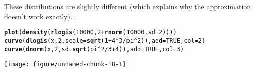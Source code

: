 \documentclass{article}\usepackage[]{graphicx}\usepackage[]{color}
\makeatletter
\def\maxwidth{ %
  \ifdim\Gin@nat@width>\linewidth
    \linewidth
  \else
    \Gin@nat@width
  \fi
}
\newcommand{\hlnum}[1]{\textcolor[rgb]{0.686,0.059,0.569}{#1}}%
\newcommand{\hlopt}[1]{\textcolor[rgb]{0,0,0}{#1}}%
\newcommand{\hlstd}[1]{\textcolor[rgb]{0.345,0.345,0.345}{#1}}%
\newcommand{\hlkwc}[1]{\textcolor[rgb]{0.333,0.667,0.333}{#1}}%
\newcommand{\hlkwd}[1]{\textcolor[rgb]{0.737,0.353,0.396}{\textbf{#1}}}%
\newenvironment{kframe}{%
 \def\at@end@of@kframe{}%
 \ifinner\ifhmode%
  \def\at@end@of@kframe{\end{minipage}}%
  \begin{minipage}{\columnwidth}%
 \fi\fi%
 \def\FrameCommand##1{\hskip\@totalleftmargin \hskip-\fboxsep
 \colorbox{shadecolor}{##1}\hskip-\fboxsep
     \hskip-\linewidth \hskip-\@totalleftmargin \hskip\columnwidth}%
 \MakeFramed {\advance\hsize-\width
   \@totalleftmargin\z@ \linewidth\hsize
   \@setminipage}}%
 {\par\unskip\endMakeFramed%
 \at@end@of@kframe}
\newenvironment{knitrout}{}{} %
\makeatother
\begin{document}
These distributions are slightly different (which explains why the approximation doesn't work exactly)...

\begin{knitrout}
\color{fgcolor}\begin{kframe}
\begin{alltt}
\hlkwd{plot}\hlstd{(}\hlkwd{density}\hlstd{(}\hlkwd{rlogis}\hlstd{(}\hlnum{10000}\hlstd{,} \hlnum{2} \hlopt{+} \hlkwd{rnorm}\hlstd{(}\hlnum{10000}\hlstd{,} \hlkwc{sd}\hlstd{=}\hlnum{2}\hlstd{))))}
\hlkwd{curve}\hlstd{(}\hlkwd{dlogis}\hlstd{(x,} \hlnum{2}\hlstd{,} \hlkwc{scale}\hlstd{=}\hlkwd{sqrt}\hlstd{(}\hlnum{1} \hlopt{+} \hlnum{4} \hlopt{*} \hlnum{3}\hlopt{/}\hlstd{pi}\hlopt{^}\hlnum{2}\hlstd{)),} \hlkwc{add}\hlstd{=}\hlnum{TRUE}\hlstd{,} \hlkwc{col}\hlstd{=}\hlnum{2}\hlstd{)}
\hlkwd{curve}\hlstd{(}\hlkwd{dnorm}\hlstd{(x,} \hlnum{2}\hlstd{,} \hlkwc{sd}\hlstd{=}\hlkwd{sqrt}\hlstd{(pi}\hlopt{^}\hlnum{2}\hlopt{/}\hlnum{3} \hlopt{+} \hlnum{4}\hlstd{)),} \hlkwc{add}\hlstd{=}\hlnum{TRUE}\hlstd{,} \hlkwc{col}\hlstd{=}\hlnum{3}\hlstd{)}
\end{alltt}
\end{kframe}
\texttt{[image: figure/unnamed-chunk-18-1]} 

\end{knitrout}



\end{document}

